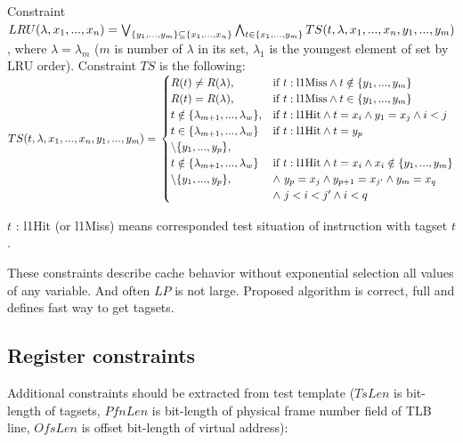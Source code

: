 \documentclass[times, 10pt,twocolumn]{article}
\begin{document}
Constraint $LRU(\lambda, x_1, ..., x_n) = \bigvee_{\{y_1, ..., y_m\} \subseteq \{x_1, ..., x_n\}} \bigwedge_{t \in \{x_1, ..., y_m\}}  TS(t, \lambda, x_1, ..., x_n,\\y_1, ..., y_m)$, where $\lambda = \lambda_m$ ($m$ is number of $\lambda$ in its set, $\lambda_1$ is the youngest element of set by LRU order). Constraint $TS$ is the following:\\
$TS(t, \lambda, x_1, ..., x_n, y_1, ..., y_m) = \\
\begin{cases}
R(t) \neq R(\lambda),&\text{if~} t:\text{l1Miss} \wedge t \notin \{y_1, ..., y_m\}\\
R(t) = R(\lambda),&\text{if~} t:\text{l1Miss} \wedge t \in \{y_1, ..., y_m\}\\
t \notin \{\lambda_{m+1}, ..., \lambda_w\},&\text{if~} t:\text{l1Hit} \wedge t = x_i \wedge y_1 = x_j \wedge i < j\\
t \in \{\lambda_{m+1}, ..., \lambda_w\}&\text{if~} t:\text{l1Hit} \wedge t = y_p\\ \setminus\{y_1, ..., y_p\},\\
t \notin \{\lambda_{m+1}, ..., \lambda_w\}&\text{if~} t:\text{l1Hit} \wedge t = x_i \wedge x_i \notin \{y_1, ..., y_m\}\\ \setminus\{y_1, ..., y_p\},& \wedge~y_p = x_j \wedge y_{p+1} = x_{j'} \wedge y_m = x_q\\& \wedge~j < i < j' \wedge i < q \\
\end{cases}$

$t$ : l1Hit (or l1Miss) means corresponded test situation of instruction with tagset $t$.

These constraints describe cache behavior without exponential selection all values of any variable. And often $LP$ is not large. Proposed algorithm is correct, full and defines fast way to get tagsets.

\subsection{Register constraints}
Additional constraints should be extracted from test template
($TsLen$ is bit-length of tagsets, $PfnLen$ is bit-length of
physical frame number field of TLB line, $OfsLen$ is offset
bit-length of virtual address):
\end{document}
